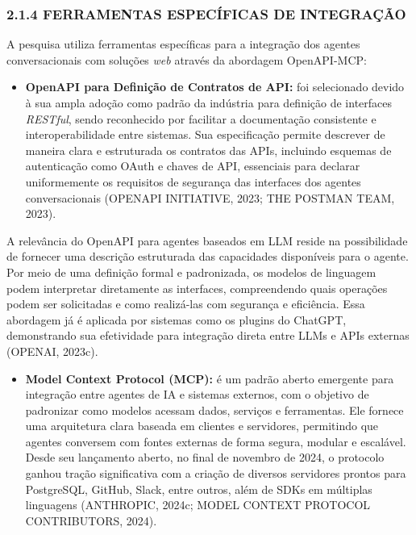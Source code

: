 \documentclass[
]{article}
\providecommand{\tightlist}{%
  \setlength{\itemsep}{0pt}\setlength{\parskip}{0pt}}
\begin{document}
\subsubsection{2.1.4 FERRAMENTAS ESPECÍFICAS DE
INTEGRAÇÃO}\label{ferramentas-especuxedficas-de-integrauxe7uxe3o}

A pesquisa utiliza ferramentas específicas para a integração dos agentes
conversacionais com soluções \emph{web} através da abordagem
OpenAPI-MCP:

\begin{itemize}
\tightlist
\item
  \textbf{OpenAPI para Definição de Contratos de API:} foi selecionado
  devido à sua ampla adoção como padrão da indústria para definição de
  interfaces \emph{RESTful}, sendo reconhecido por facilitar a
  documentação consistente e interoperabilidade entre sistemas. Sua
  especificação permite descrever de maneira clara e estruturada os
  contratos das APIs, incluindo esquemas de autenticação como OAuth e
  chaves de API, essenciais para declarar uniformemente os requisitos de
  segurança das interfaces dos agentes conversacionais (OPENAPI
  INITIATIVE, 2023; THE POSTMAN TEAM, 2023).
\end{itemize}

A relevância do OpenAPI para agentes baseados em LLM reside na
possibilidade de fornecer uma descrição estruturada das capacidades
disponíveis para o agente. Por meio de uma definição formal e
padronizada, os modelos de linguagem podem interpretar diretamente as
interfaces, compreendendo quais operações podem ser solicitadas e como
realizá-las com segurança e eficiência. Essa abordagem já é aplicada por
sistemas como os plugins do ChatGPT, demonstrando sua efetividade para
integração direta entre LLMs e APIs externas (OPENAI, 2023c).

\begin{itemize}
\tightlist
\item
  \textbf{Model Context Protocol (MCP):} é um padrão aberto emergente
  para integração entre agentes de IA e sistemas externos, com o
  objetivo de padronizar como modelos acessam dados, serviços e
  ferramentas. Ele fornece uma arquitetura clara baseada em clientes e
  servidores, permitindo que agentes conversem com fontes externas de
  forma segura, modular e escalável. Desde seu lançamento aberto, no
  final de novembro de 2024, o protocolo ganhou tração significativa com
  a criação de diversos servidores prontos para PostgreSQL, GitHub,
  Slack, entre outros, além de SDKs em múltiplas linguagens (ANTHROPIC,
  2024c; MODEL CONTEXT PROTOCOL CONTRIBUTORS, 2024).
\end{itemize}
\end{document}
